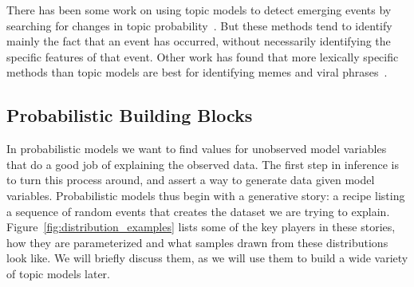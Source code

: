 There has been some work on using topic models to detect emerging events by searching for changes in topic probability~\citep{alsumait-08}.
But these methods tend to identify mainly the fact that an event has occurred, without necessarily identifying the specific features of that event.
Other work has found that more lexically specific methods than topic
models are best for identifying memes and viral
phrases~\citep{leskovec-09}. \\


\subsection{Probabilistic Building Blocks}
\label{sec:intro_building_blocks}

In probabilistic models we want to find values for unobserved model variables that do a good job of explaining the observed data.
The first step in inference is to turn this process around, and assert a way to generate data given model variables.
Probabilistic models thus begin with a generative story: a recipe listing a sequence of random events
that creates the dataset we are trying to explain.
Figure~\ref{fig:distribution_examples} lists some of the key players in these
stories, how they are parameterized and what samples drawn from these distributions look like.  We will
briefly discuss them, as we will use them to build a wide variety of topic models later.

